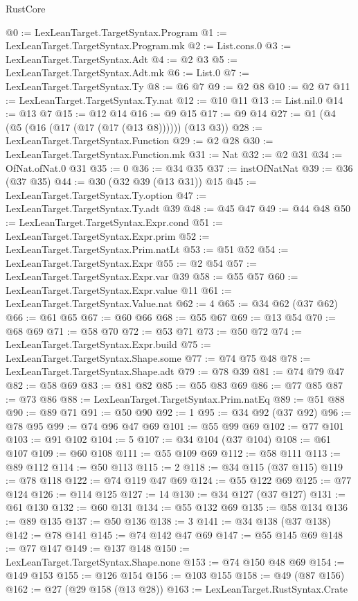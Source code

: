 \begin{lexlean}{RustCore}
\begin{coremodule}
@0 := LexLeanTarget.TargetSyntax.Program
@1 := LexLeanTarget.TargetSyntax.Program.mk
@2 := List.cons.{0}
@3 := LexLeanTarget.TargetSyntax.Adt
@4 := @2 @3
@5 := LexLeanTarget.TargetSyntax.Adt.mk
@6 := List.{0}
@7 := LexLeanTarget.TargetSyntax.Ty
@8 := @6 @7
@9 := @2 @8
@10 := @2 @7
@11 := LexLeanTarget.TargetSyntax.Ty.nat
@12 := @10 @11
@13 := List.nil.{0}
@14 := @13 @7
@15 := @12 @14
@16 := @9 @15
@17 := @9 @14
@27 := @1 (@4 (@5 (@16 (@17 (@17 (@17 (@13 @8)))))) (@13 @3))
@28 := LexLeanTarget.TargetSyntax.Function
@29 := @2 @28
@30 := LexLeanTarget.TargetSyntax.Function.mk
@31 := Nat
@32 := @2 @31
@34 := OfNat.ofNat.{0} @31
@35 := 0
@36 := @34 @35
@37 := instOfNatNat
@39 := @36 (@37 @35)
@44 := @30 (@32 @39 (@13 @31)) @15
@45 := LexLeanTarget.TargetSyntax.Ty.option
@47 := LexLeanTarget.TargetSyntax.Ty.adt @39
@48 := @45 @47
@49 := @44 @48
@50 := LexLeanTarget.TargetSyntax.Expr.cond
@51 := LexLeanTarget.TargetSyntax.Expr.prim
@52 := LexLeanTarget.TargetSyntax.Prim.natLt
@53 := @51 @52
@54 := LexLeanTarget.TargetSyntax.Expr
@55 := @2 @54
@57 := LexLeanTarget.TargetSyntax.Expr.var @39
@58 := @55 @57
@60 := LexLeanTarget.TargetSyntax.Expr.value @11
@61 := LexLeanTarget.TargetSyntax.Value.nat
@62 := 4
@65 := @34 @62 (@37 @62)
@66 := @61 @65
@67 := @60 @66
@68 := @55 @67
@69 := @13 @54
@70 := @68 @69
@71 := @58 @70
@72 := @53 @71
@73 := @50 @72
@74 := LexLeanTarget.TargetSyntax.Expr.build
@75 := LexLeanTarget.TargetSyntax.Shape.some
@77 := @74 @75 @48
@78 := LexLeanTarget.TargetSyntax.Shape.adt
@79 := @78 @39
@81 := @74 @79 @47
@82 := @58 @69
@83 := @81 @82
@85 := @55 @83 @69
@86 := @77 @85
@87 := @73 @86
@88 := LexLeanTarget.TargetSyntax.Prim.natEq
@89 := @51 @88
@90 := @89 @71
@91 := @50 @90
@92 := 1
@95 := @34 @92 (@37 @92)
@96 := @78 @95
@99 := @74 @96 @47 @69
@101 := @55 @99 @69
@102 := @77 @101
@103 := @91 @102
@104 := 5
@107 := @34 @104 (@37 @104)
@108 := @61 @107
@109 := @60 @108
@111 := @55 @109 @69
@112 := @58 @111
@113 := @89 @112
@114 := @50 @113
@115 := 2
@118 := @34 @115 (@37 @115)
@119 := @78 @118
@122 := @74 @119 @47 @69
@124 := @55 @122 @69
@125 := @77 @124
@126 := @114 @125
@127 := 14
@130 := @34 @127 (@37 @127)
@131 := @61 @130
@132 := @60 @131
@134 := @55 @132 @69
@135 := @58 @134
@136 := @89 @135
@137 := @50 @136
@138 := 3
@141 := @34 @138 (@37 @138)
@142 := @78 @141
@145 := @74 @142 @47 @69
@147 := @55 @145 @69
@148 := @77 @147
@149 := @137 @148
@150 := LexLeanTarget.TargetSyntax.Shape.none
@153 := @74 @150 @48 @69
@154 := @149 @153
@155 := @126 @154
@156 := @103 @155
@158 := @49 (@87 @156)
@162 := @27 (@29 @158 (@13 @28))
@163 := LexLeanTarget.RustSyntax.Crate

\end{coremodule}
\end{lexlean}
